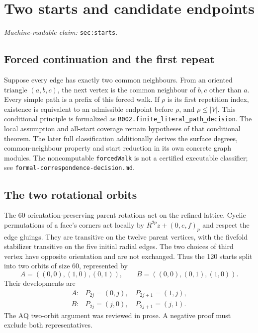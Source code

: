 \documentclass[11pt]{amsart}
\newcommand{\record}[1]{\nolinkurl{#1}}
\newcommand{\claimid}[1]{\par\nopagebreak\noindent\textit{Machine-readable claim:} \record{#1}.\par}
\begin{document}
\section{Two starts and candidate endpoints}\label{sec:starts}
\claimid{sec:starts}
\subsection{Forced continuation and the first repeat}
Suppose every edge has exactly two common neighbours. From an oriented
triangle $(a,b,c)$, the next vertex is the common neighbour of $b,c$
other than $a$. Every simple path is a prefix of this forced walk. If
$\rho$ is its first repetition index, existence is equivalent to an
admissible endpoint before $\rho$, and $\rho\le |V|$. This conditional
principle is formalized as \record{R002.finite_literal_path_decision}.
The local assumption and all-start coverage remain hypotheses of
that conditional theorem. The later full classification additionally
derives the surface degrees, common-neighbour property and start
reduction in its own concrete graph modules.
The noncomputable \record{forcedWalk} is not a certified executable
classifier; see \record{formal-correspondence-decision.md}.

\subsection{The two rotational orbits}
The 60 orientation-preserving parent rotations act on the refined
lattice. Cyclic permutations of a face's corners act locally by
$R^{2p}z+(0,e,f)_p$ and respect the edge gluings. They are transitive
on the twelve parent vertices, with the fivefold stabilizer transitive
on the five initial radial edges. The two choices of third vertex have
opposite orientation and are not exchanged. Thus the 120 starts split
into two orbits of size 60, represented by
\[
 A=((0,0),(1,0),(0,1)),\qquad B=((0,0),(0,1),(1,0)).
\]
Their developments are
\begin{equation}\label{eq:3}
\begin{array}{ll}
 A: & P_{2j}=(0,j),\quad P_{2j+1}=(1,j),\\
 B: & P_{2j}=(j,0),\quad P_{2j+1}=(j,1).
\end{array}\tag{3}
\end{equation}
The AQ two-orbit argument was reviewed in prose. A negative proof must
exclude both representatives.
\end{document}
